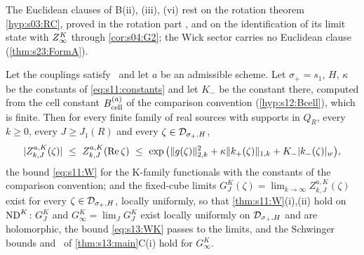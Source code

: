 \begin{remark}\label{rem:s13:rotation}
The Euclidean clauses of B(ii), (iii), (vi) rest on the rotation theorem \cref{hyp:s03:RC}, proved in the rotation part , and on the identification of its limit state with $Z^{K}_{\infty}$ through \cref{cor:s04:G2}; the Wick sector carries no Euclidean clause (\cref{thm:s23:FormA}).
\end{remark}

\begin{theorem}\label{thm:s13:TWK}
Let the couplings satisfy \Tthree\ and let $a$ be an admissible scheme. Let $\sigma_+=s_1$, $H$, $\kappa$ be the constants of \eqref{eq:s11:constants} and let $K_-$ be the constant there, computed from the cell constant $B^{(a)}_{\rm cell}$ of the comparison convention (\cref{hyp:s12:Bcell}), which is finite. Then for every finite family of real sources with supports in $Q_R$, every $k\ge0$, every $J\ge J_1(R)$ and every $\zeta\in\mathcal D_{\sigma_+,H}$,
\begin{equation}\label{eq:s13:WK}
|Z^{a,K}_{k,J}(\zeta)|\ \le\ Z^{a,K}_{k,J}(\Re\zeta)\ \le\ \exp\big(\norm{g(\zeta)}_{2,k}^2+\kappa\norm{k_+(\zeta)}_{1,k}+K_-\wnorm{k_-(\zeta)}\big),
\end{equation}
the bound \eqref{eq:s11:W} for the K-family functionals with the constants of the comparison convention; and the fixed-cube limits $G^K_J(\zeta)=\lim_{k\to\infty}Z^{a,K}_{k,J}(\zeta)$ exist for every $\zeta\in\mathcal D_{\sigma_+,H}$, locally uniformly, so that \cref{thm:s11:W}(i),(ii) hold on $\mathrm{ND}^{K}$: $G^K_J$ and $G^K_\infty=\lim_JG^K_J$ exist locally uniformly on $\mathcal D_{\sigma_+,H}$ and are holomorphic, the bound \eqref{eq:s13:WK} passes to the limits, and the Schwinger bounds and \Ezz\ of \cref{thm:s13:main}C(i) hold for $G^K_\infty$.
\end{theorem}

